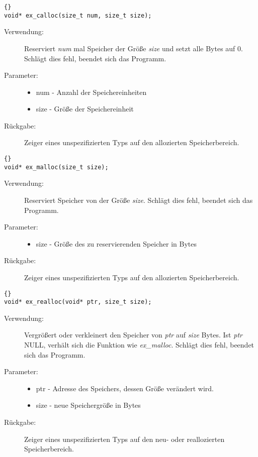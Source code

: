\documentclass[11pt,a4paper,notitlepage]{report}
\begin{document}
	\begin{lstlisting}[caption=ex\_calloc]{}
void* ex_calloc(size_t num, size_t size);
	\end{lstlisting}
	
	\begin{description}
		\item[Verwendung:] Reserviert \textit{num} mal Speicher der Größe \textit{size} und setzt alle Bytes auf 0. Schlägt dies fehl, beendet sich das Programm.
		\item[Parameter:] \hfill
			\begin{itemize}
				\item num - Anzahl der Speichereinheiten
				\item size - Größe der Speichereinheit
			\end{itemize}
		\item[Rückgabe:] Zeiger eines unspezifizierten Typs auf den allozierten Speicherbereich.
	\end{description}
	
	\begin{lstlisting}[caption=ex\_malloc]{}
void* ex_malloc(size_t size);
	\end{lstlisting}
	
	\begin{description}
		\item[Verwendung:] Reserviert Speicher von der Größe \textit{size}. Schlägt dies fehl, beendet sich das Programm.
		\item[Parameter:] \hfill
			\begin{itemize}
				\item size - Größe des zu reservierenden Speicher in Bytes
			\end{itemize}
		\item[Rückgabe:] Zeiger eines unspezifizierten Typs auf den allozierten Speicherbereich.
	\end{description}
	
		\begin{lstlisting}[caption=ex\_realloc]{}
void* ex_realloc(void* ptr, size_t size);
		\end{lstlisting}
	
	\begin{description}
		\item[Verwendung:] Vergrößert oder verkleinert den Speicher von \textit{ptr} auf \textit{size} Bytes. Ist \textit{ptr} NULL, verhält sich die Funktion wie \textit{ex\_malloc}. Schlägt dies fehl, beendet sich das Programm.
		\item[Parameter:] \hfill
		\begin{itemize}
			\item ptr - Adresse des Speichers, dessen Größe verändert wird.
			\item size - neue Speichergröße in Bytes
		\end{itemize}
		\item[Rückgabe:] Zeiger eines unspezifizierten Typs auf den neu- oder reallozierten Speicherbereich.
	\end{description}
	
\end{document}
